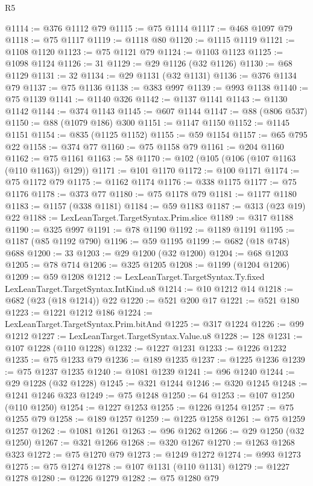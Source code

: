 \begin{lexlean}{R5}
\begin{coremodule}
@1114 := @376 @1112 @79
@1115 := @75 @1114
@1117 := @468 @1097 @79
@1118 := @75 @1117
@1119 := @1118 @80
@1120 := @1115 @1119
@1121 := @1108 @1120
@1123 := @75 @1121 @79
@1124 := @1103 @1123
@1125 := @1098 @1124
@1126 := 31
@1129 := @29 @1126 (@32 @1126)
@1130 := @68 @1129
@1131 := 32
@1134 := @29 @1131 (@32 @1131)
@1136 := @376 @1134 @79
@1137 := @75 @1136
@1138 := @383 @997
@1139 := @993 @1138
@1140 := @75 @1139
@1141 := @1140 @326
@1142 := @1137 @1141
@1143 := @1130 @1142
@1144 := @374 @1143
@1145 := @607 @1144
@1147 := @88 (@806 @537)
@1150 := @88 (@1079 @186) @300
@1151 := @1147 @1150
@1152 := @1145 @1151
@1154 := @835 (@1125 @1152)
@1155 := @59 @1154
@1157 := @65 @795 @22
@1158 := @374 @77
@1160 := @75 @1158 @79
@1161 := @204 @1160
@1162 := @75 @1161
@1163 := 58
@1170 := @102 (@105 (@106 (@107 @1163 (@110 @1163)) @129))
@1171 := @101 @1170
@1172 := @100 @1171
@1174 := @75 @1172 @79
@1175 := @1162 @1174
@1176 := @338 @1175
@1177 := @75 @1176
@1178 := @373 @77
@1180 := @75 @1178 @79
@1181 := @1177 @1180
@1183 := @1157 (@338 @1181)
@1184 := @59 @1183
@1187 := @313 (@23 @19) @22
@1188 := LexLeanTarget.TargetSyntax.Prim.slice
@1189 := @317 @1188
@1190 := @325 @997
@1191 := @78 @1190
@1192 := @1189 @1191
@1195 := @1187 (@85 @1192 @790)
@1196 := @59 @1195
@1199 := @682 (@18 @748) @688
@1200 := 33
@1203 := @29 @1200 (@32 @1200)
@1204 := @68 @1203
@1205 := @78 @714
@1206 := @325 @1205
@1208 := @1199 (@1204 @1206)
@1209 := @59 @1208
@1212 := LexLeanTarget.TargetSyntax.Ty.fixed LexLeanTarget.TargetSyntax.IntKind.u8
@1214 := @10 @1212 @14
@1218 := @682 (@23 (@18 @1214)) @22
@1220 := @521 @200 @17
@1221 := @521 @180
@1223 := @1221 @1212 @186
@1224 := LexLeanTarget.TargetSyntax.Prim.bitAnd
@1225 := @317 @1224
@1226 := @99 @1212
@1227 := LexLeanTarget.TargetSyntax.Value.u8
@1228 := 128
@1231 := @107 @1228 (@110 @1228)
@1232 := @1227 @1231
@1233 := @1226 @1232
@1235 := @75 @1233 @79
@1236 := @189 @1235
@1237 := @1225 @1236
@1239 := @75 @1237 @1235
@1240 := @1081 @1239
@1241 := @96 @1240
@1244 := @29 @1228 (@32 @1228)
@1245 := @321 @1244
@1246 := @320 @1245
@1248 := @1241 @1246 @323
@1249 := @75 @1248
@1250 := 64
@1253 := @107 @1250 (@110 @1250)
@1254 := @1227 @1253
@1255 := @1226 @1254
@1257 := @75 @1255 @79
@1258 := @189 @1257
@1259 := @1225 @1258
@1261 := @75 @1259 @1257
@1262 := @1081 @1261
@1263 := @96 @1262
@1266 := @29 @1250 (@32 @1250)
@1267 := @321 @1266
@1268 := @320 @1267
@1270 := @1263 @1268 @323
@1272 := @75 @1270 @79
@1273 := @1249 @1272
@1274 := @993 @1273
@1275 := @75 @1274
@1278 := @107 @1131 (@110 @1131)
@1279 := @1227 @1278
@1280 := @1226 @1279
@1282 := @75 @1280 @79

\end{coremodule}
\end{lexlean}
